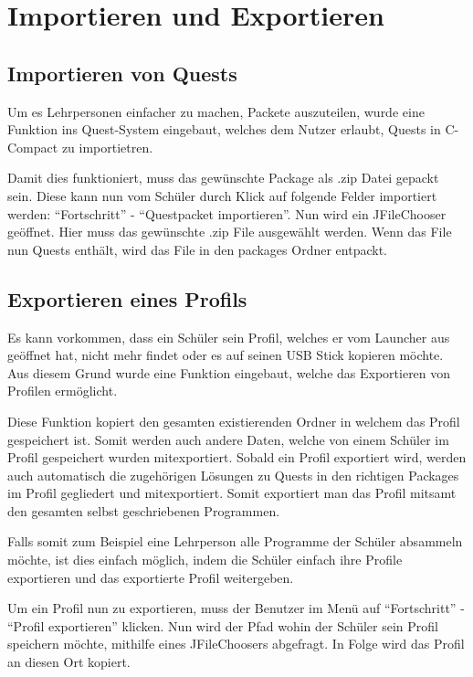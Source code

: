 \section{Importieren und Exportieren}
\subsection{Importieren von Quests}
Um es Lehrpersonen einfacher zu machen, Packete auszuteilen, wurde eine Funktion ins Quest-System eingebaut, welches dem Nutzer erlaubt, Quests in C-Compact zu importietren.

Damit dies funktioniert, muss das gewünschte Package als .zip Datei gepackt sein. Diese kann nun vom Schüler durch Klick auf folgende Felder importiert werden: "`Fortschritt"' -  "`Questpacket importieren"'. Nun wird ein JFileChooser geöffnet. Hier muss das gewünschte .zip File ausgewählt werden. Wenn das File nun Quests enthält, wird das File in den packages Ordner entpackt.

\subsection{Exportieren eines Profils}
Es kann vorkommen, dass ein Schüler sein Profil, welches er vom Launcher aus geöffnet hat, nicht mehr findet oder es auf seinen USB Stick kopieren möchte. Aus diesem Grund wurde eine Funktion eingebaut, welche das Exportieren von Profilen ermöglicht.

Diese Funktion kopiert den gesamten existierenden Ordner in welchem das Profil gespeichert ist. Somit werden auch andere Daten, welche von einem Schüler im Profil gespeichert wurden mitexportiert. Sobald ein Profil exportiert wird, werden auch automatisch die zugehörigen Lösungen zu Quests in den richtigen Packages im Profil gegliedert und mitexportiert. Somit exportiert man das Profil mitsamt den gesamten selbst geschriebenen Programmen.

Falls somit zum Beispiel eine Lehrperson alle Programme der Schüler absammeln möchte, ist dies einfach möglich, indem die Schüler einfach ihre Profile exportieren und das exportierte Profil weitergeben.

Um ein Profil nun zu exportieren, muss der Benutzer im Menü auf "`Fortschritt"' - "`Profil exportieren"' klicken. Nun wird der Pfad wohin der Schüler sein Profil speichern möchte, mithilfe eines JFileChoosers abgefragt. In Folge wird das Profil an diesen Ort kopiert.